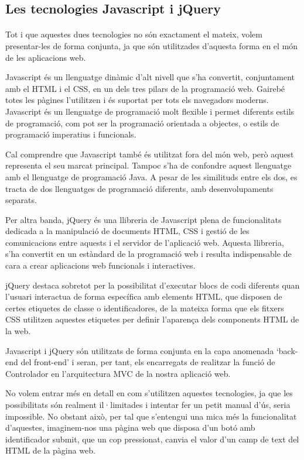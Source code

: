 \subsection{Les tecnologies Javascript i jQuery}

    \paragraph{}
    Tot i que aquestes dues tecnologies no són exactament el mateix, volem presentar-les de forma conjunta, ja que són utilitzades d’aquesta forma en el món de les aplicacions web.

    Javascript és un llenguatge dinàmic d'alt nivell que s'ha convertit, conjuntament amb el HTML i el CSS, en un dels tres pilars de la programació web. Gairebé totes les pàgines l'utilitzen i és suportat per tots els navegadors moderns. Javascript és un llenguatge de programació molt flexible i permet diferents estils de programació, com pot ser la programació orientada a objectes,  o estils de programació imperatius i funcionals.

    Cal comprendre que Javascript també és utilitzat fora del món web, però aquest  representa el seu marcat principal. Tampoc s'ha de confondre aquest llenguatge amb el llenguatge de programació Java. A pesar de les similituds entre els dos, es tracta de dos llenguatges de programació diferents, amb desenvolupaments separats.

    Per altra banda, jQuery és una llibreria de Javascript plena de funcionalitats dedicada a la manipulació de documents HTML, CSS i gestió de les comunicacions entre aquests i el servidor de l’aplicació web. Aquesta llibreria, s'ha convertit en un estàndard de la programació web i resulta indispensable de cara a crear aplicacions web funcionals i interactives.

    jQuery destaca sobretot per la possibilitat d’executar blocs de codi diferents quan l’usuari interactua de forma específica amb elements HTML, que disposen de certes etiquetes de classe o identificadores, de la mateixa forma que els fitxers CSS utilitzen aquestes etiquetes per definir l’aparença dels components HTML de la web.

    Javascript i jQuery són utilitzats de forma conjunta en la capa anomenada `back-end del front-end’ i seran, per tant, els encarregats de realitzar la funció de Controlador en l'arquitectura MVC de la nostra aplicació web.

    No volem entrar més en detall en com s’utilitzen aquestes tecnologies, ja que les possibilitats són realment il·limitades i intentar fer un petit manual d’ús, seria impossible. No obstant això, per tal que s'entengui una mica més la funcionalitat d'aquestes,  imaginem-nos una pàgina web que disposa d'un botó amb identificador submit, que un cop pressionat, canvia el valor d'un camp de text del HTML de la pàgina web.


